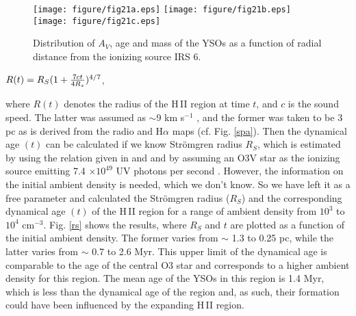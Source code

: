 \documentclass[a4paper,fleqn,usenatbib,useAMS]{mnras}
\begin{document}
\begin{figure*}
\centering\texttt{[image: figure/fig21a.eps]}
\centering\texttt{[image: figure/fig21b.eps]}
\centering\texttt{[image: figure/fig21c.eps]}
\caption{\label{rage} Distribution of $A_V$, age and mass of the YSOs as a function of radial distance from the ionizing source IRS 6. }
\end{figure*}

$R(t) = R_S (1+ {{7ct}\over{4R_s}})^{4/7} $,

\noindent
where $R(t)$ denotes the radius of the H\,{\sevensize II}  region at time $t$, and $c$ is the sound speed.
The latter was assumed as $\sim$9 km s$^{-1}$ \citep{1976RMxAA...1..373P,2005fost.book.....S}, and 
the former was taken to be 3 pc as is derived from the radio and H$\alpha$ maps (cf. Fig. \ref{spa}).
Then the dynamical age $(t)$ can be calculated if we know Str\"omgren radius $R_S$, which 
is estimated by using the relation given in \citet{2011isf..book.....W} and \citet{2005fost.book.....S}
and by assuming an O3V star as the  ionizing source emitting 7.4 $\times 10^{49}$ UV photons per second \citep{1996ApJ...460..914V}. 
However, the information on the initial ambient density is needed, which we don't know. 
So we have left it as a free parameter and calculated the Str\"omgren radius ($R_S$) and the 
corresponding dynamical age $(t)$ of the H\,{\sevensize II} region for a range of 
ambient density from $10^3$ to 
$10^4$ cm$^{-3}$. Fig. \ref{rs} shows the results, where $R_S$ and $t$ are plotted as a function of the initial ambient density. The former varies from $\sim$ 1.3 to 0.25 pc, while the latter varies from $\sim$ 0.7 to 2.6 Myr. 
This upper limit of the dynamical age is comparable to the age of the central 
O3 star and corresponds to  a higher ambient  density for this region.
The mean age of the YSOs in this region is 1.4 Myr, which is less than the dynamical age of the region
and, as such, their formation could have been influenced by the  expanding H\,{\sevensize II} region.
\end{document}
